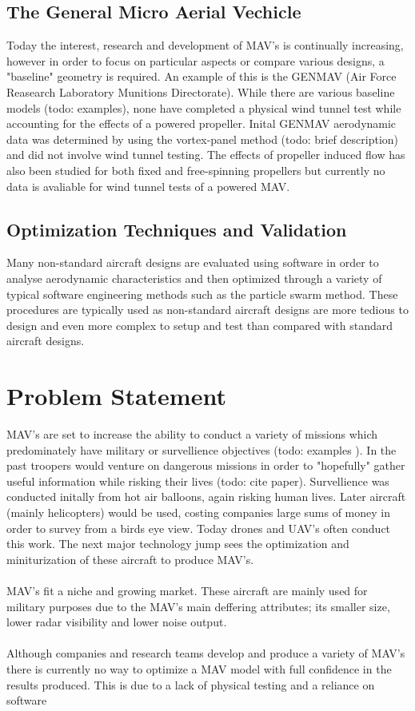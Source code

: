 \subsection{The General Micro Aerial Vechicle}
\label{subsec:GenMAV}
Today the interest, research and development of MAV's is continually increasing, however in order to focus on particular aspects or compare various designs, a "baseline" geometry is required. An example of this is the GENMAV (Air Force Reasearch Laboratory Munitions Directorate). While there are various baseline models (todo: examples), none have completed a physical wind tunnel test while accounting for the effects of a powered propeller. Inital GENMAV aerodynamic data was determined by using the vortex-panel method (todo: brief description) and did not involve wind tunnel testing. The effects of propeller induced flow has also been studied for both fixed and free-spinning propellers but currently no data is avaliable for wind tunnel tests of a powered MAV.

\subsection{Optimization Techniques and Validation}
\label{subsec:Optimization}
Many non-standard aircraft designs are evaluated using software in order to analyse aerodynamic characteristics and then optimized through a variety of typical software engineering methods such as the particle swarm method. These procedures are typically used as non-standard aircraft designs are more tedious to design and even more complex to setup and test than compared with standard aircraft designs. 


\section{Problem Statement}
\label{ProblemStatement}
MAV's are set to increase the ability to conduct a variety of missions which predominately have military or survellience objectives (todo: examples ). In the past troopers would venture on dangerous missions in order to "hopefully" gather useful information while risking their lives (todo: cite paper). Survellience was conducted initally from hot air balloons, again risking human lives. Later aircraft (mainly helicopters) would be used, costing companies large sums of money in order to survey from a birds eye view. Today drones and UAV's often conduct this work. The next major technology jump sees the optimization and miniturization of these aircraft to produce MAV's. \\
\\
MAV's fit a niche and growing market. These aircraft are mainly used for military purposes due to the MAV's main deffering attributes; its smaller size, lower radar visibility and lower noise output.\\
\\
Although companies and research teams develop and produce a variety of MAV's there is currently no way to optimize a MAV model with full confidence in the results produced. This is due to a lack of physical testing and a reliance on software 

